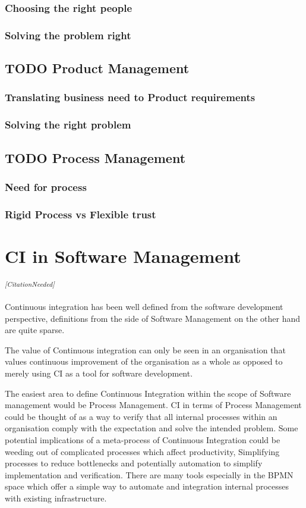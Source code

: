 \documentclass[10pt,conference]{IEEEtran}
\newcommand{\citationneeded}{\textsuperscript{\textit{[CitationNeeded]}}}
\begin{document}
\subsubsection*{Choosing the right people}
\subsubsection*{Solving the problem right}

\subsection*{TODO Product Management}

\subsubsection*{Translating business need to Product requirements}
\subsubsection*{Solving the right problem}

\subsection*{TODO Process Management}
\subsubsection*{Need for process}
\subsubsection*{Rigid Process vs Flexible trust} \cite{benner_exploitation_2003}

\section*{CI in Software Management}

\citationneeded

Continuous integration has been well defined from the software development perspective, definitions from the side of Software Management on the other hand are quite sparse. 

The value of Continuous integration can only be seen in an organisation that values continuous improvement of the organisation as a whole as opposed to merely using CI as a tool for software development.

The easiest area to define Continuous Integration within the scope of Software management would be Process Management. CI in terms of Process Management could be thought of as a way to verify that all internal processes within an organisation comply with the expectation and solve the intended problem. Some potential implications of a meta-process of Continuous Integration could be weeding out of complicated processes which affect productivity, Simplifying processes to reduce bottlenecks and potentially automation to simplify implementation and verification. There are many tools especially in the BPMN space which offer a simple way to automate and integration internal processes with existing infrastructure. 
\end{document}
